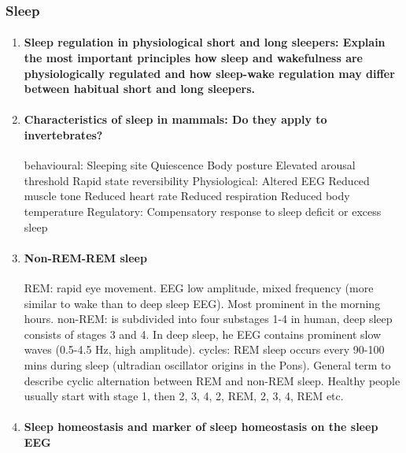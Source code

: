 \documentclass[12pt,article,oneside,a4paper]{memoir}
\begin{document}
\subsubsection{Sleep}
\begin{enumerate}
\item \paragraph{Sleep regulation in physiological short and long sleepers: Explain the most important principles how sleep and wakefulness are physiologically regulated and how sleep-wake regulation may differ between habitual short and long sleepers.}\label{question:sleep-physiological}

\item \paragraph{Characteristics of sleep in mammals: Do they apply to invertebrates?}
behavioural:
Sleeping site 
Quiescence
Body posture
Elevated arousal threshold
Rapid state reversibility
Physiological:
Altered EEG
Reduced muscle tone
Reduced heart rate
Reduced respiration
Reduced body temperature
Regulatory:
Compensatory response to sleep deficit or excess sleep

\item \paragraph{Non-REM-REM sleep}

REM: rapid eye movement. EEG low amplitude, mixed frequency (more similar to wake than to deep sleep EEG). Most prominent in the morning hours.
non-REM: is subdivided into four substages 1-4 in human, deep sleep consists of stages 3 and 4. In deep sleep, he EEG contains prominent slow waves (0.5-4.5 Hz, high amplitude).
cycles: REM sleep occurs every 90-100 mins during sleep (ultradian oscillator origins in the Pons). General term to describe cyclic alternation between REM and non-REM sleep. Healthy people usually start with stage 1, then 2, 3, 4, 2, REM, 2, 3, 4, REM etc.

\item \paragraph{Sleep homeostasis and marker of sleep homeostasis on the sleep EEG}


\end{enumerate}
\end{document}

